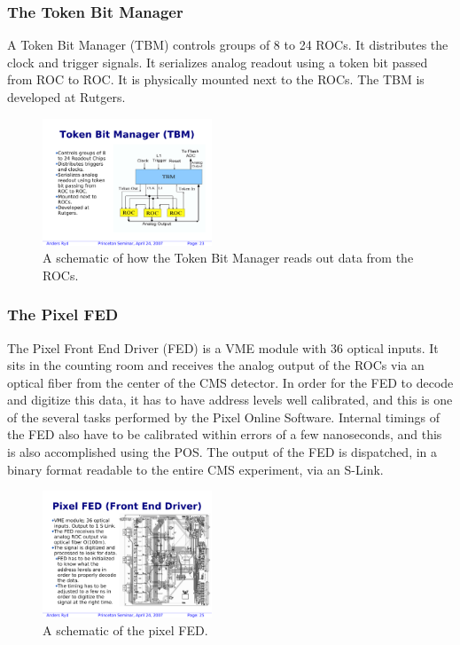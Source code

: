 \clearpage

\subsubsection{The Token Bit Manager}

A Token Bit Manager (TBM) controls groups of 8 to 24 ROCs.
It distributes the clock and trigger signals.
It serializes analog readout using a token bit 
passed from ROC to ROC. It is physically mounted next to the ROCs.
The TBM is developed at Rutgers.

\begin{figure}[h]
\begin{center}
 \includegraphics[width=0.45\textwidth]{TBM.pdf}
\end{center}
\caption{A schematic of how the Token Bit Manager reads out data from the ROCs.}
\label{fig:TBM}
\end{figure}

\clearpage

\subsubsection{The Pixel FED}

The Pixel Front End Driver (FED) is a VME module
with 36 optical inputs. It sits in the counting room and receives the analog output
of the ROCs via an optical fiber from the center of the CMS detector.
In order for the FED to decode and digitize this data, it has to have address levels 
well calibrated, and this is one of the several tasks performed by the Pixel Online Software.
Internal timings of the FED also have to be calibrated within errors of a few nanoseconds,
and this is also accomplished using the POS. The output of the FED
is dispatched, in a binary format readable to the entire CMS experiment, via an S-Link.

\begin{figure}[h]
\begin{center}
 \includegraphics[width=0.45\textwidth]{pFED.pdf}
\end{center}
\caption{A schematic of the pixel FED.}
\label{fig:pFED}
\end{figure}

